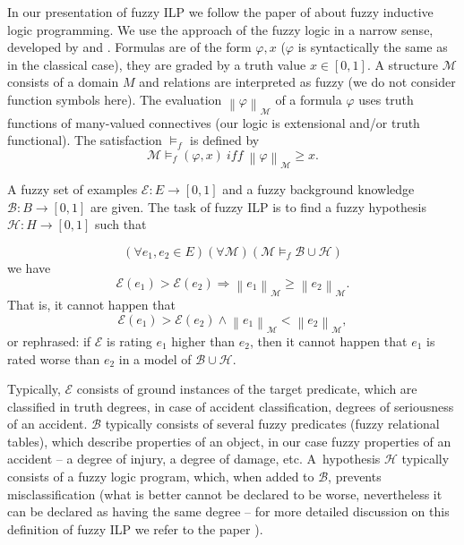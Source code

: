 In our presentation of fuzzy ILP we follow the paper of 
\cite{biblio:FILP} about fuzzy inductive logic programming.
We use the approach of the fuzzy logic in a narrow sense, developed by 
\cite{biblio:Pavelka} and 
\cite{biblio:Hajek}. Formulas are of the form $\varphi, x$ ($\varphi$ is syntactically the same as in the classical case), they are graded by a truth value $x\in [0,1]$.
A structure ${\mathcal M}$ consists of a domain $M$ and relations are interpreted as fuzzy (we do not consider function symbols here). The evaluation $\left\|\varphi\right\|_{{\mathcal M}}$ of a formula $\varphi$ uses truth functions of many-valued connectives (our logic is extensional and/or truth functional). The satisfaction $\models_f$ is defined by
$$
{\mathcal M}\models_f (\varphi, x)\ iff\ \left\|\varphi\right\|_{{\mathcal M}}\ge x.
$$

\begin{definition}
A fuzzy set of examples ${\mathcal E}:E\longrightarrow [0,1]$ and a fuzzy background knowledge ${\mathcal B}:B\longrightarrow [0,1]$ are given. The task of fuzzy ILP is to find a fuzzy hypothesis ${\mathcal H}:H\longrightarrow [0,1]$ such that 

$$
(\forall e_1,e_2\in E)(\forall {\mathcal M})({\mathcal M}\models_f {\mathcal B}\cup {\mathcal H})
$$
we have
$$
{\mathcal E}(e_1)>{\mathcal E}(e_2)\Rightarrow \left\|e_1\right\|_{{\mathcal M}}\ge \left\|e_2\right\|_{{\mathcal M}}.
$$
That is, it cannot happen that
$$
{\mathcal E}(e_1)>{\mathcal E}(e_2) \wedge \left\|e_1\right\|_{{\mathcal M}}< \left\|e_2\right\|_{{\mathcal M}},
$$
or rephrased: if ${\mathcal E}$ is rating $e_1$ higher than $e_2$, then it cannot happen that $e_1$ is rated worse than $e_2$ in a model of ${\mathcal B}\cup {\mathcal H}$.
\end{definition}

Typically, ${\mathcal E}$ consists of ground instances of the target predicate, which are classified in truth degrees, in case of accident classification, degrees of seriousness of an accident. ${\mathcal B}$ typically consists of several fuzzy predicates (fuzzy relational tables), which describe properties of an object, in our case fuzzy properties of an accident -- a degree of injury, a degree of damage, etc. 
A~hypothesis ${\mathcal H}$ typically consists of a fuzzy logic program, which, when added to ${\mathcal B}$, prevents misclassification (what is better cannot be declared to be worse, nevertheless it can be declared as having the same degree -- for more detailed discussion on this definition of fuzzy ILP we refer to the paper \citep{biblio:FILP}).





